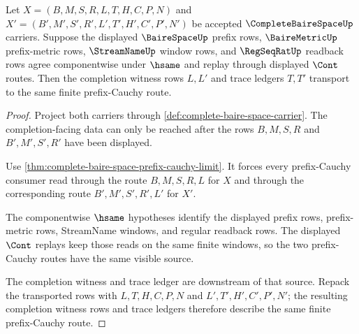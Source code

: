 \begin{theorem}
\label{thm:complete-baire-space-prefix-window-stability}
Let $X=(B,M,S,R,L,T,H,C,P,N)$ and $X'=(B',M',S',R',L',T',H',C',P',N')$ be accepted $\CompleteBaireSpaceUp$ carriers. Suppose the displayed $\BaireSpaceUp$ prefix rows, $\BaireMetricUp$ prefix-metric rows, $\StreamNameUp$ window rows, and $\RegSeqRatUp$ readback rows agree componentwise under $\hsame$ and replay through displayed $\Cont$ routes. Then the completion witness rows $L,L'$ and trace ledgers $T,T'$ transport to the same finite prefix-Cauchy route.
\end{theorem}
\begin{proof}
Project both carriers through \autoref{def:complete-baire-space-carrier}. The completion-facing data can only be reached after the rows $B,M,S,R$ and $B',M',S',R'$ have been displayed.

Use \autoref{thm:complete-baire-space-prefix-cauchy-limit}. It forces every prefix-Cauchy consumer read through the route $B,M,S,R,L$ for $X$ and through the corresponding route $B',M',S',R',L'$ for $X'$.

The componentwise $\hsame$ hypotheses identify the displayed prefix rows, prefix-metric rows, StreamName windows, and regular readback rows. The displayed $\Cont$ replays keep those reads on the same finite windows, so the two prefix-Cauchy routes have the same visible source.

The completion witness and trace ledger are downstream of that source. Repack the transported rows with $L,T,H,C,P,N$ and $L',T',H',C',P',N'$; the resulting completion witness rows and trace ledgers therefore describe the same finite prefix-Cauchy route.
\end{proof}

